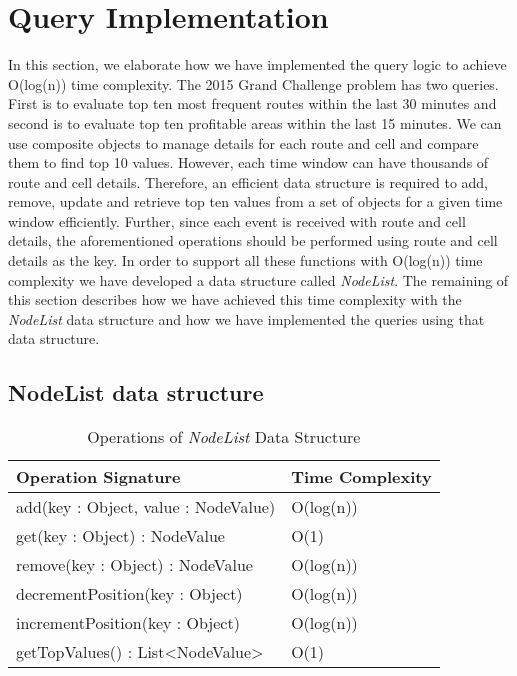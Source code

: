 \section{Query Implementation}
In this section, we elaborate how we have implemented the query logic to achieve O(log(n)) time complexity. The 2015 Grand Challenge problem has two queries. First is to evaluate top ten most frequent routes within the last 30 minutes and second is to evaluate top ten profitable areas within the last 15 minutes. We can use composite objects to manage details for each route and cell and compare them to find top 10 values. However, each time window can have thousands of route and cell details. Therefore, an efficient data structure is required to add, remove, update and retrieve top ten values from a set of objects for a given time window efficiently. Further, since each event is received with route and cell details, the aforementioned operations should be performed using route and cell details as the key. In order to support all these functions with O(log(n)) time complexity we have developed a data structure called \textit{NodeList}. The remaining of this section describes how we have achieved this time complexity with the \textit{NodeList} data structure and how we have implemented the queries using that data structure.

\subsection{NodeList data structure}

\begin{table}
\centering
\caption{Operations of \textit{NodeList} Data Structure}
\begin{tabular}{|l|l|} \hline
Operation Signature & Time Complexity \\ \hline \hline
add(key : Object, value : NodeValue) & O(log(n)) \\ \hline 
get(key : Object) : NodeValue & O(1) \\ \hline
remove(key : Object) : NodeValue & O(log(n)) \\ \hline
decrementPosition(key : Object) & O(log(n)) \\ \hline
incrementPosition(key : Object) & O(log(n)) \\ \hline
getTopValues() : List<NodeValue> & O(1) \\ \hline
\end{tabular}
\label{nodelist_api}
\end{table}


